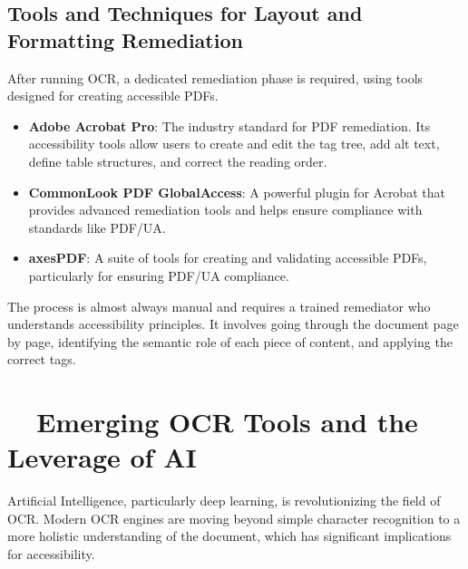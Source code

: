\subsection{Tools and Techniques for Layout and Formatting Remediation}
\label{subsec:ocr-remediation-tools}
After running OCR, a dedicated remediation phase is required, using tools designed for creating accessible PDFs.
\begin{itemize}
	\item \textbf{Adobe Acrobat Pro}: The industry standard for PDF remediation. Its accessibility tools allow users to create and edit the tag tree, add alt text, define table structures, and correct the reading order.
	\item \textbf{CommonLook PDF GlobalAccess\supercite{AllyantCommonLook}}: A powerful plugin for Acrobat that provides advanced remediation tools and helps ensure compliance with standards like PDF/UA.
	\item \textbf{axesPDF}: A suite of tools for creating and validating accessible PDFs, particularly for ensuring PDF/UA compliance.
\end{itemize}
The process is almost always manual and requires a trained remediator who understands accessibility principles. It involves going through the document page by page, identifying the semantic role of each piece of content, and applying the correct tags.

\section{~~Emerging OCR Tools and the Leverage of AI}
\label{sec:ocr-ai}
Artificial Intelligence, particularly deep learning, is revolutionizing the field of OCR. Modern OCR engines are moving beyond simple character recognition to a more holistic understanding of the document, which has significant implications for accessibility.

